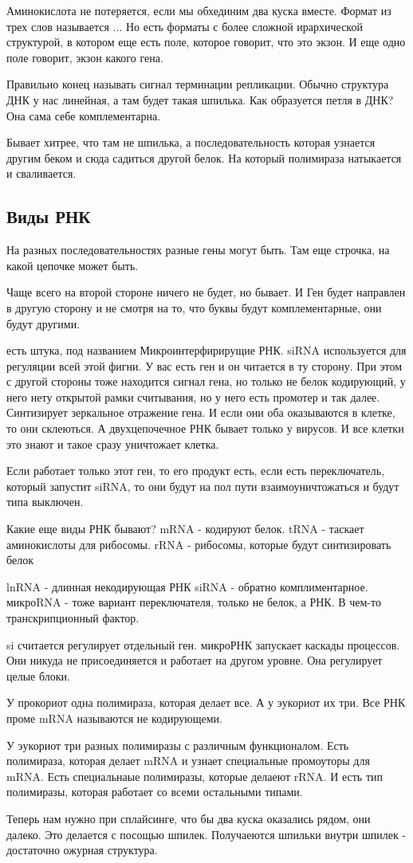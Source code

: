 Аминокислота не потеряется, если мы обхединим
два куска вместе. Формат из трех слов называется ...
Но есть форматы с более сложной ирархической структурой,
в котором еще есть поле, которое говорит, что это экзон.
И еще одно поле говорит, экзон какого гена.

Правильно конец называть сигнал терминации репликации. Обычно
структура ДНК у нас линейная, а там будет
такая шпилька. Как образуется петля в ДНК? Она
сама себе комплементарна.

Бывает хитрее, что там не шпилька, а последовательность которая
узнается другим беком и сюда садиться другой белок.
На который полимираза натыкается и сваливается.

\subsection{Виды РНК}
На разных последовательностях разные гены могут быть. Там еще строчка,
на какой цепочке может быть.

Чаще всего на второй стороне ничего не будет, но бывает. И Ген будет
направлен в другую сторону и не смотря на то, что буквы будут
комплементарные, они будут другими.

есть штука, под названием Микроинтерфирирущие РНК.
siRNA используется для регуляции всей этой фигни. У вас есть
ген и он читается в ту сторону. При этом с другой стороны тоже
находится сигнал гена, но только не белок кодирующий, у него нету
открытой рамки считывания, но у него есть промотер и так далее.
Синтизирует зеркальное отражение гена. И если
они оба оказываются в клетке, то они склеються. А двухцепочечное
РНК бывает только у вирусов. И все клетки это знают и такое
сразу уничтожает клетка.

Если работает только этот ген, то его продукт есть, если
есть переключатель, который запустит siRNA, то они будут на пол пути
взаимоуничтожаться и будут типа выключен.

Какие еще виды РНК бывают?
mRNA - кодируют белок. 
tRNA - таскает аминокислоты для рибосомы. 
rRNA - рибосомы, которые будут синтизировать белок

lnRNA - длинная некодирующая РНК
siRNA - обратно комплиментарное. 
микроRNA  - тоже вариант переключателя, только не белок, а РНК. В чем-то транскрипционный фактор. 

si считается регулирует отдельный ген. 
микроРНК запускает каскады процессов. Они никуда не присоединяется и работает на другом 
уровне. Она регулирует целые блоки. 

У прокориот одна полимираза, которая делает все. А у эукориот их три. Все РНК проме mRNA
называются не кодирующеми. 

У эукориот три разных полимиразы с различным 
функционалом. Есть полимираза, которая делает mRNA и узнает 
специальные промоуторы для mRNA. Есть специальнаые полимиразы, 
которые делаеют rRNA. И есть тип полимиразы, которая работает со всеми остальными типами. 


Теперь нам нужно при сплайсинге, что бы два куска оказались рядом, они далеко. Это 
делается с посощью шпилек. Получаеются шпильки внутри шпилек - достаточно ожурная структура. 

 



